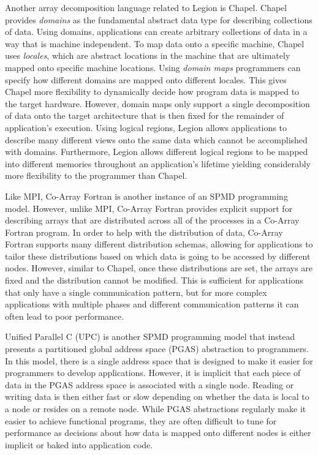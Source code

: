 Another array decomposition language related to
Legion is Chapel\cite{Chapel07}. Chapel provides
{\em domains} as the fundamental abstract data 
type for describing collections of data. Using
domains, applications can create arbitrary 
collections of data in a way that is machine
independent. To map data onto a specific machine, Chapel 
uses {\em locales}, which are abstract locations
in the machine that are ultimately mapped onto
specific machine locations. Using {\em domain
maps} programmers can specify how different domains
are mapped onto different locales. This gives
Chapel more flexibility to dynamically decide
how program data is mapped to the target hardware.
However, domain maps only support a single decomposition
of data onto the target architecture that is then
fixed for the remainder of application's execution.
Using logical regions, Legion allows applications to 
describe many different views onto the same data which
cannot be accomplished with domains. Furthermore, 
Legion allows different logical regions to be
mapped into different memories throughout an 
application's lifetime yielding considerably 
more flexibility to the programmer than Chapel.

Like MPI, Co-Array Fortran\cite{CoArray98} is another
instance of an SPMD programming model. However, unlike
MPI, Co-Array Fortran provides explicit support for
describing arrays that are distributed across all
of the processes in a Co-Array Fortran program. 
In order to help with the distribution of data, 
Co-Array Fortran supports many different distribution
schemas, allowing for applications to tailor these
distributions based on which data is going to be
accessed by different nodes. However, similar to
Chapel, once these distributions are set, the arrays
are fixed and the distribution cannot be modified.
This is sufficient for applications that only
have a single communication pattern, but for more
complex applications with multiple phases and
different communication patterns it can often lead
to poor performance.

Unified Parallel C (UPC)\cite{UPC99,UPCSTANDARD} is
another SPMD programming model that instead presents
a partitioned global address space (PGAS) abstraction
to programmers. In this model, there is a single address
space that is designed to make it easier for programmers
to develop applications.  However, it is implicit that
each piece of data in the PGAS address space is associated
with a single node. Reading or writing data is then either
fast or slow depending on whether the data is local to a
node or resides on a remote node. While PGAS abstractions
regularly make it easier to achieve functional programs,
they are often difficult to tune for performance as 
decisions about how data is mapped onto different nodes
is either implicit or baked into application code.

